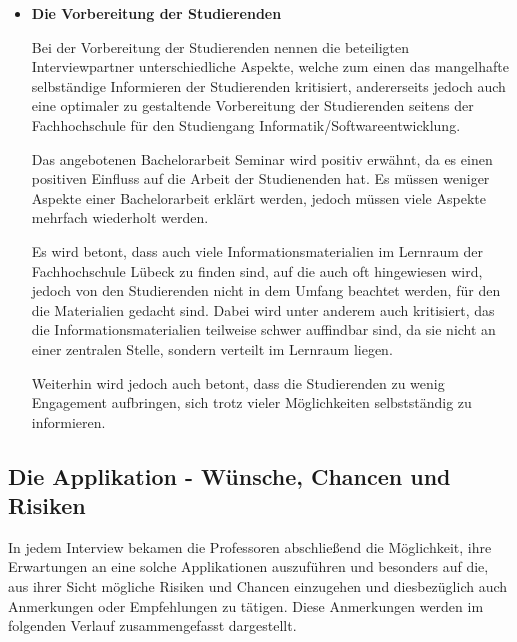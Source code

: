 \documentclass{scrreprt}
\begin{document}
\begin{itemize}
\item \textbf{Die Vorbereitung der Studierenden}
\par Bei der Vorbereitung der Studierenden nennen die beteiligten Interviewpartner unterschiedliche Aspekte, welche zum einen das mangelhafte selbständige Informieren der Studierenden kritisiert, andererseits jedoch auch eine optimaler zu gestaltende Vorbereitung der Studierenden seitens der Fachhochschule für den Studiengang Informatik/Softwareentwicklung.
\par Das angebotenen Bachelorarbeit Seminar wird positiv erwähnt, da es einen positiven Einfluss auf die Arbeit der Studienenden hat. Es müssen weniger Aspekte einer Bachelorarbeit erklärt werden, jedoch müssen viele Aspekte mehrfach wiederholt werden. 
\par Es wird betont, dass auch viele Informationsmaterialien im Lernraum der Fachhochschule Lübeck zu finden sind, auf die auch oft hingewiesen wird, jedoch von den Studierenden nicht in dem Umfang beachtet werden, für den die Materialien gedacht sind. Dabei wird unter anderem auch kritisiert, das die Informationsmaterialien teilweise schwer auffindbar sind, da sie nicht an einer zentralen Stelle, sondern verteilt im Lernraum liegen. 
\par Weiterhin wird jedoch auch betont, dass die Studierenden zu wenig Engagement aufbringen, sich trotz vieler Möglichkeiten selbstständig zu informieren. 
\end{itemize}

\subsection{Die Applikation - Wünsche, Chancen und Risiken}
\par In jedem Interview bekamen die Professoren abschließend die Möglichkeit, ihre Erwartungen an eine solche Applikationen auszuführen und besonders auf die, aus ihrer Sicht mögliche Risiken und Chancen einzugehen und diesbezüglich auch Anmerkungen oder Empfehlungen zu tätigen. Diese Anmerkungen werden im folgenden Verlauf zusammengefasst dargestellt.
\end{document}
